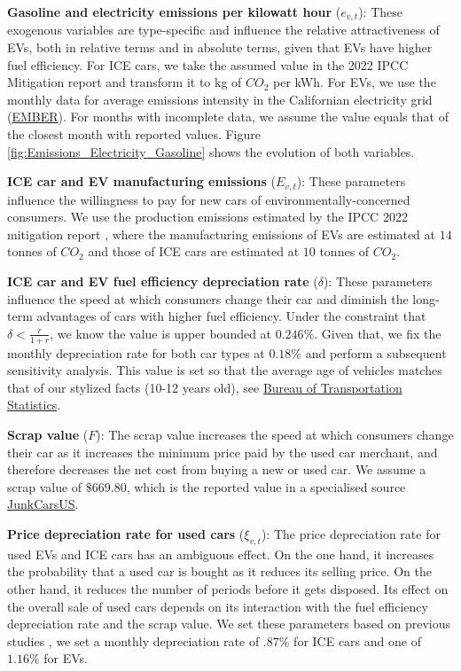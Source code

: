 \documentclass[12pt]{article}
\begin{document}
	\textbf{Gasoline and electricity emissions per kilowatt hour} ($e_{v,t}$): These exogenous variables are type-specific and influence the relative attractiveness of EVs, both in relative terms and in absolute terms, given that EVs have higher fuel efficiency. For ICE cars, we take the assumed value in the 2022 IPCC Mitigation report \citep[Table 10.8]{ipcc2022transport} and transform it to kg of $CO_2$ per kWh. For EVs, we use the monthly data for average emissions intensity in the Californian electricity grid (\href{https://ember-energy.org/data/us-electricity-data-explorer/}{EMBER}). For months with incomplete data, we assume the value equals that of the closest month with reported values. Figure \ref{fig:Emissions_Electricity_Gasoline} shows the evolution of both variables.
	
	\textbf{ICE car and EV manufacturing emissions} ($E_{v,t}$): These parameters influence the willingness to pay for new cars of environmentally-concerned consumers. We use the production emissions estimated by the IPCC 2022 mitigation report \citep[1076]{ipcc2022transport}, where the manufacturing emissions of EVs are estimated at $14$ tonnes of $CO_2$ and those of ICE cars are estimated at $10$ tonnes of $CO_2$.
	
	\textbf{ICE car and EV fuel efficiency depreciation rate} ($\delta$): These parameters influence the speed at which consumers change their car and diminish the long-term advantages of cars with higher fuel efficiency. Under the constraint that $\delta<\frac{r}{1+r}$, we know the value is upper bounded at $0.246\%$. Given that, we fix the monthly depreciation rate for both car types at $0.18\%$ and perform a subsequent sensitivity analysis. This value is set so that the average age of vehicles matches that of our stylized facts (10-12 years old), see \href{https://www.bts.gov/content/average-age-automobiles-and-trucks-operation-united-states}{Bureau of Transportation Statistics}.
	
	\textbf{Scrap value} ($F$): The scrap value increases the speed at which consumers change their car as it increases the minimum price paid by the used car merchant, and therefore decreases the net cost from buying a new or used car. We assume a scrap value of $\$669.80$, which is the reported value in a specialised source \href{https://junkcarsus.com/prices}{JunkCarsUS}.
	
	\textbf{Price depreciation rate for used cars} ($\xi_{v,t}$): The price depreciation rate for used EVs and ICE cars has an ambiguous effect. On the one hand, it increases the probability that a used car is bought as it reduces its selling price. On the other hand, it reduces the number of periods before it gets disposed. Its effect on the overall sale of used cars depends on its interaction with the fuel efficiency depreciation rate and the scrap value. We set these parameters based on previous studies \citep{SCHLOTER20222Depreciation}, we set a monthly depreciation rate of $.87\%$ for ICE cars and one of $1.16\%$ for EVs.
	
\end{document}
